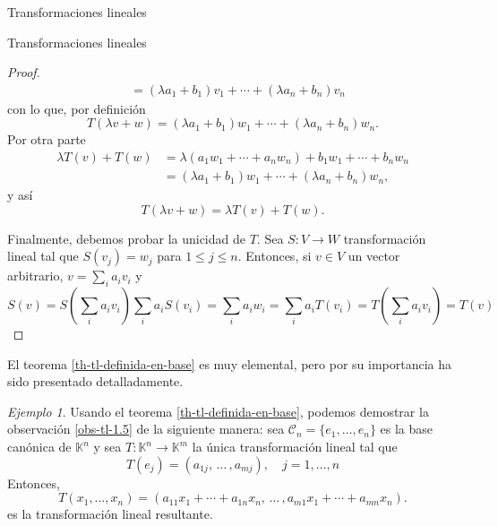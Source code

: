 \documentclass[a4paper,12pt,twoside,spanish,reqno]{amsbook}
\numberwithin{equation}{section}
\theoremstyle{definition}
\theoremstyle{remark}
\newtheorem*{ejemplo*}{Ejemplo}
\newcommand{\K}{\mathbb K}
\begin{document}
\begin{chapter}{Transformaciones lineales}
\begin{section}{Transformaciones lineales}
\begin{proof}
\begin{align*}
                    &= (\lambda a_1+b_1)v_1 + \cdots+(\lambda a_n+b_n)v_n
                \end{align*}
                con lo que, por definición
                \begin{equation*}
                    T(\lambda v+w) =(\lambda a_1+b_1)w_1 + \cdots+(\lambda a_n+b_n)w_n. 
                \end{equation*}
                Por otra parte
                \begin{align*}
                \lambda  T(v) + T(w) &= \lambda (a_1w_1 + \cdots+a_n w_n)+b_1w_1 + \cdots+b_n w_n	 \\
                 &=(\lambda a_1+b_1)w_1 + \cdots+(\lambda a_n+b_n)w_n ,			
                \end{align*}
                y así
                \begin{equation*}
                    T(\lambda v+w) = 	\lambda  T(v) + T(w).
                \end{equation*}
                
                Finalmente,  debemos probar la unicidad de $T$. Sea $S: V \to W$ transformación lineal tal que $S(v_j) = w_j$ para $1 \le j \le n$. Entonces,  si $v \in V$ un vector arbitrario, $v = \sum_i a_i v_i$ y
                \begin{equation*}
                    S(v) = S(\sum_i a_i v_i)\sum_i a_i S( v_i) = \sum_i a_iw_i = 
                     \sum_i a_i T( v_i) =  T(\sum_i a_i v_i) = T(v)
                \end{equation*}
            \end{proof}
        
        El teorema \ref{th-tl-definida-en-base} es muy elemental, pero por su importancia ha sido presentado
        detalladamente. 
        
            \begin{ejemplo*} Usando el teorema \ref{th-tl-definida-en-base}, podemos demostrar la observación \ref{obs-tl-1.5} de la siguiente manera: sea  $\mathcal C_n = \{e_1,\ldots,e_n\}$ es la base canónica de $\K^n$ y  sea  $T: \K^n \to \K^m$ la única transformación lineal tal que 
            \begin{equation*}
            T(e_j)  = (a_{1j},\, \ldots\,,a_{mj} ), \quad j=1,\ldots,n
            \end{equation*}	
            Entonces, 
            \begin{equation*}
            T(x_1,\ldots,x_n) = (a_{11}x_1+\cdots + a_{1n}x_n,\, \ldots\,,a_{m1}x_1+\cdots + a_{mn}x_n ).
            \end{equation*}
            es la transformación lineal resultante.
        \end{ejemplo*}
        

\end{section}
\end{chapter}
\end{document}

